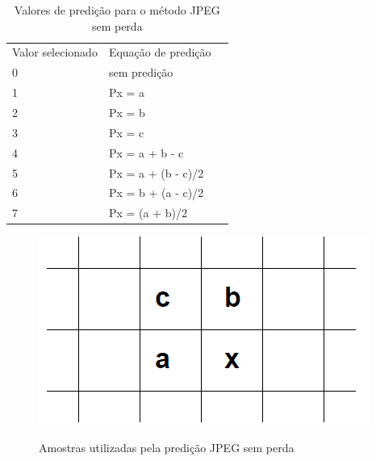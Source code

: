 \begin{table}[]
    \begin{center}
        \caption{\small Valores de predição para o método JPEG sem perda}
        \label{t.jpegstandart}
        \begin{tabular}{llr}
            Valor selecionado   & Equação de predição   \\
            0                   & sem predição          \\
            1                   & Px = a                \\
            2                   & Px = b                \\
            3                   & Px = c                \\
            4                   & Px = a + b - c        \\
            5                   & Px = a + (b - c)/2    \\
            6                   & Px = b + (a - c)/2    \\
            7                   & Px = (a + b)/2        \\
        \end{tabular}
    \end{center}
\end{table}

\begin{figure}[h]
\caption{\small Amostras utilizadas pela predição JPEG sem perda}
\centering
\includegraphics[scale=0.50]{figs/jpeg_standart.png}
\label{f.jpegstandart}
\end{figure}

